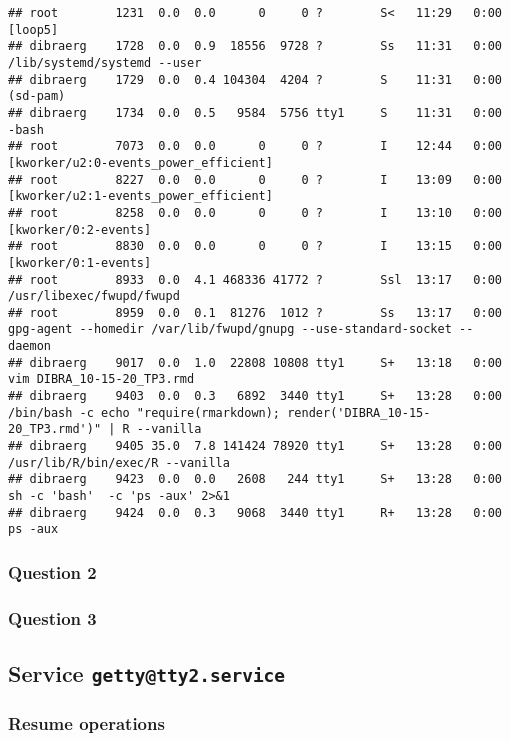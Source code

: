 \documentclass[]{article}
\begin{document}
\begin{verbatim}
## root        1231  0.0  0.0      0     0 ?        S<   11:29   0:00 [loop5]
## dibraerg    1728  0.0  0.9  18556  9728 ?        Ss   11:31   0:00 /lib/systemd/systemd --user
## dibraerg    1729  0.0  0.4 104304  4204 ?        S    11:31   0:00 (sd-pam)
## dibraerg    1734  0.0  0.5   9584  5756 tty1     S    11:31   0:00 -bash
## root        7073  0.0  0.0      0     0 ?        I    12:44   0:00 [kworker/u2:0-events_power_efficient]
## root        8227  0.0  0.0      0     0 ?        I    13:09   0:00 [kworker/u2:1-events_power_efficient]
## root        8258  0.0  0.0      0     0 ?        I    13:10   0:00 [kworker/0:2-events]
## root        8830  0.0  0.0      0     0 ?        I    13:15   0:00 [kworker/0:1-events]
## root        8933  0.0  4.1 468336 41772 ?        Ssl  13:17   0:00 /usr/libexec/fwupd/fwupd
## root        8959  0.0  0.1  81276  1012 ?        Ss   13:17   0:00 gpg-agent --homedir /var/lib/fwupd/gnupg --use-standard-socket --daemon
## dibraerg    9017  0.0  1.0  22808 10808 tty1     S+   13:18   0:00 vim DIBRA_10-15-20_TP3.rmd
## dibraerg    9403  0.0  0.3   6892  3440 tty1     S+   13:28   0:00 /bin/bash -c echo "require(rmarkdown); render('DIBRA_10-15-20_TP3.rmd')" | R --vanilla
## dibraerg    9405 35.0  7.8 141424 78920 tty1     S+   13:28   0:00 /usr/lib/R/bin/exec/R --vanilla
## dibraerg    9423  0.0  0.0   2608   244 tty1     S+   13:28   0:00 sh -c 'bash'  -c 'ps -aux' 2>&1
## dibraerg    9424  0.0  0.3   9068  3440 tty1     R+   13:28   0:00 ps -aux
\end{verbatim}

\hypertarget{question-2-1}{%
\subsubsection{Question 2}\label{question-2-1}}

\hypertarget{question-3}{%
\subsubsection{Question 3}\label{question-3}}

\hypertarget{service-gettytty2.service}{%
\subsection{\texorpdfstring{Service
\texttt{getty@tty2.service}}{Service getty@tty2.service}}\label{service-gettytty2.service}}

\hypertarget{resume-operations}{%
\subsubsection{Resume operations}\label{resume-operations}}
\end{document}
